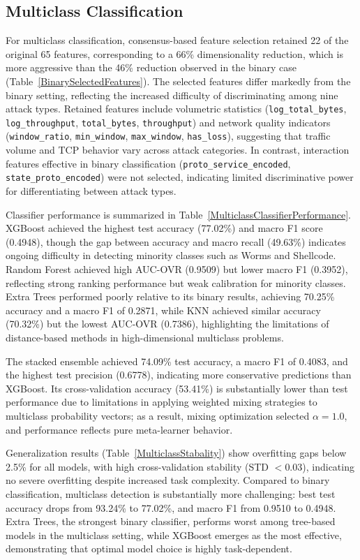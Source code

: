 \documentclass[pdflatex,sn-mathphys-num]{sn-jnl}
\theoremstyle{thmstyleone}%
\theoremstyle{thmstyletwo}%
\theoremstyle{thmstylethree}%
\begin{document}
\subsection{Multiclass Classification}
For multiclass classification, consensus-based feature selection retained 22 of the original 65 features, corresponding to a 66\% dimensionality reduction, which is more aggressive than the 46\% reduction observed in the binary case (Table~\ref{BinarySelectedFeatures}). The selected features differ markedly from the binary setting, reflecting the increased difficulty of discriminating among nine attack types. Retained features include volumetric statistics (\texttt{log\_total\_bytes}, \texttt{log\_throughput}, \texttt{total\_bytes}, \texttt{throughput}) and network quality indicators (\texttt{window\_ratio}, \texttt{min\_window}, \texttt{max\_window}, \texttt{has\_loss}), suggesting that traffic volume and TCP behavior vary across attack categories. In contrast, interaction features effective in binary classification (\texttt{proto\_service\_encoded}, \texttt{state\_proto\_encoded}) were not selected, indicating limited discriminative power for differentiating between attack types.

Classifier performance is summarized in Table~\ref{MulticlassClassifierPerformance}. XGBoost achieved the highest test accuracy (77.02\%) and macro F1 score (0.4948), though the gap between accuracy and macro recall (49.63\%) indicates ongoing difficulty in detecting minority classes such as Worms and Shellcode. Random Forest achieved high AUC-OVR (0.9509) but lower macro F1 (0.3952), reflecting strong ranking performance but weak calibration for minority classes. Extra Trees performed poorly relative to its binary results, achieving 70.25\% accuracy and a macro F1 of 0.2871, while KNN achieved similar accuracy (70.32\%) but the lowest AUC-OVR (0.7386), highlighting the limitations of distance-based methods in high-dimensional multiclass problems.

The stacked ensemble achieved 74.09\% test accuracy, a macro F1 of 0.4083, and the highest test precision (0.6778), indicating more conservative predictions than XGBoost. Its cross-validation accuracy (53.41\%) is substantially lower than test performance due to limitations in applying weighted mixing strategies to multiclass probability vectors; as a result, mixing optimization selected $\alpha = 1.0$, and performance reflects pure meta-learner behavior.

Generalization results (Table~\ref{MulticlassStabality}) show overfitting gaps below 2.5\% for all models, with high cross-validation stability (STD $< 0.03$), indicating no severe overfitting despite increased task complexity. Compared to binary classification, multiclass detection is substantially more challenging: best test accuracy drops from 93.24\% to 77.02\%, and macro F1 from 0.9510 to 0.4948. Extra Trees, the strongest binary classifier, performs worst among tree-based models in the multiclass setting, while XGBoost emerges as the most effective, demonstrating that optimal model choice is highly task-dependent.
\end{document}
